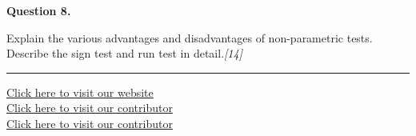 \documentclass[11pt,a4paper]{article}
\newcommand{\pts}[1]{\hfill   \textit{[#1]}}
\begin{document}
\medskip


\noindent   \textbf{Question 8.}



\noindent Explain the various advantages and disadvantages of non-parametric tests. Describe the sign test and run test in detail.\pts{14}

\vfill
\rule{\linewidth}{0.4pt}

\begin{center}\small
  \href{https://bhu-exam.vercel.app/}{Click here to visit our website}\\[4pt]
  \href{https://me-aryan.vercel.app/}{Click here to visit our contributor}\\[4pt]
  \href{https://quashan-me.vercel.app/}{Click here to visit our contributor}
\end{center}
\end{document}
